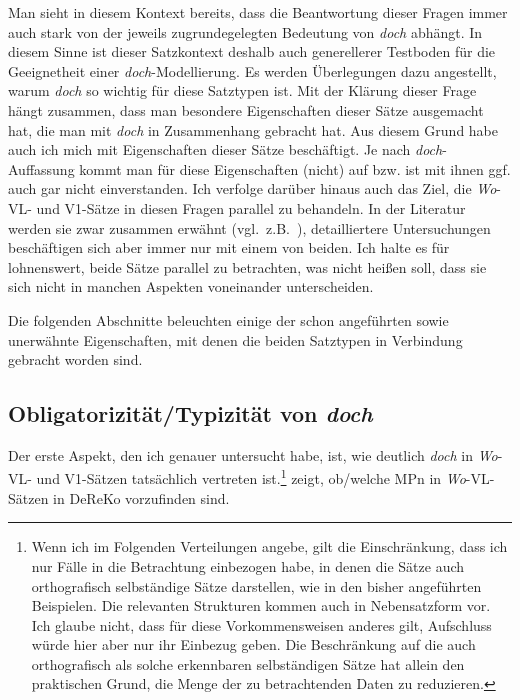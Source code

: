 {Man sieht in diesem Kontext bereits, dass die Beantwortung dieser Fragen immer auch stark von der jeweils zugrundegelegten Bedeutung von \textit{doch} abhängt. In diesem Sinne ist dieser Satzkontext deshalb auch generellerer Testboden für die Geeignetheit einer \textit{doch}-Modellierung. Es werden Überlegungen dazu angestellt, warum \textit{doch} so wichtig für diese Satztypen ist. Mit der Klärung dieser Frage hängt zusammen, dass man besondere Eigenschaften dieser Sätze ausgemacht hat, die man mit \textit{doch} in Zusammenhang gebracht hat. Aus diesem Grund habe auch ich mich mit Eigenschaften dieser Sätze beschäftigt. Je nach \textit{doch}-Auffassung kommt man für diese Eigenschaften (nicht) auf bzw. ist mit ihnen ggf. auch gar nicht einverstanden. Ich verfolge darüber hinaus auch das Ziel, die \textit{Wo}-VL- und V1-Sätze in diesen Fragen parallel zu behandeln. In der Literatur werden sie zwar zusammen erwähnt (vgl.\ z.B.\ \citealt[161]{Oennerfors1997}), detaillier\-tere Untersuchungen beschäftigen sich aber immer nur mit einem von beiden. Ich halte es für lohnenswert, beide Sätze parallel zu betrachten, was nicht heißen soll, dass sie sich nicht in manchen Aspekten voneinander unterscheiden.

Die folgenden Abschnitte beleuchten einige der schon angeführten sowie unerwähnte Eigenschaften, mit denen die beiden Satztypen in Verbindung gebracht worden sind.
	
\subsection{Obligatorizität/Typizität von \textit{doch}}
\label{sec:korp}
Der erste Aspekt, den ich genauer untersucht habe, ist, wie deutlich \textit{doch} in \textit{Wo}-VL- und V1-Sätzen tatsächlich vertreten ist.\footnote{Wenn ich im Folgenden Verteilungen angebe, gilt die Einschränkung, dass ich nur Fälle in die Betrachtung einbezogen habe, in denen die Sätze auch orthografisch selbständige Sätze darstellen, wie in den bisher angeführten Beispielen. Die relevanten Strukturen kommen auch in Nebensatzform vor. Ich glaube nicht, dass für diese Vorkommensweisen anderes gilt, Aufschluss würde hier aber nur ihr Einbezug geben. Die Beschränkung auf die auch orthografisch als solche erkennbaren selbständigen Sätze hat allein den praktischen Grund, die Menge der zu betrachtenden Daten zu reduzieren.}  zeigt, ob\slash welche MPn in \textit{Wo}-VL-Sätzen in DeReKo vorzufinden sind.

}
